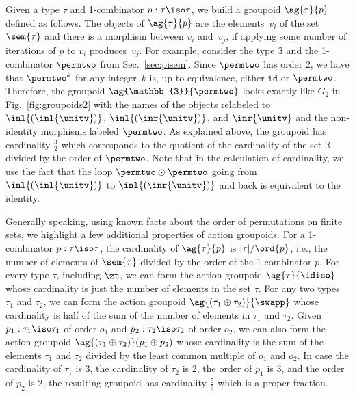 Given a type $\tau$ and 1-combinator $p : \tau \iso \tau$, we build a
groupoid $\ag{\tau}{p}$ defined as follows. The objects of
$\ag{\tau}{p}$ are the elements~$v_i$ of the set $\sem{\tau}$ and there
is a morphism between $v_i$ and~$v_j$, if applying some number of
iterations of $p$ to $v_i$ produces~$v_j$. For example, consider the
type $\mathbb{3}$ and the 1-combinator $\permtwo$ from
Sec.~\ref{sec:pisem}. Since $\permtwo$ has order 2, we have that $\permtwo ^ k$
for any integer~$k$ is, up to equivalence, either $\texttt{id}$ or
$\permtwo$. Therefore, the groupoid $\ag{\mathbb{3}}{\permtwo}$ looks exactly like
$G_2$ in Fig.~\ref{fig:groupoids2} with the names of the objects
relabeled to $\inl{(\inl{\unitv})}$, $\inl{(\inr{\unitv})}$, and
$\inr{\unitv}$ and the non-identity morphisms labeled $\permtwo$. As
explained above, the groupoid has cardinality $\frac{3}{2}$ which
corresponds to the quotient of the cardinality of the set $\mathbb{3}$
divided by the order of $\permtwo$. Note that in the calculation of
cardinality, we use the fact that the loop $\permtwo \odot \permtwo$ going from
$\inl{(\inl{\unitv})}$ to $\inl{(\inr{\unitv})}$ and back is equivalent
to the identity.

Generally speaking, using known facts about the order of permutations
on finite sets, we highlight a few additional properties of action
groupoids. For a 1-combinator $p : \tau \iso \tau$, the cardinality of
$\ag{\tau}{p}$ is $|\tau|/\ord{p}$, i.e., the number of elements of
$\sem{\tau}$ divided by the order of the 1-combinator $p$.  For every
type $\tau$, including $\zt$, we can form the action groupoid
$\ag{\tau}{\idiso}$ whose cardinality is just the number of elements
in the set $\tau$. For any two types $\tau_1$ and $\tau_2$, we can
form the action groupoid $\ag{(\tau_1\oplus\tau_2)}{\swapp}$ whose
cardinality is half of the sum of the number of elements in $\tau_1$
and $\tau_2$. Given $p_1 : \tau_1 \iso \tau_1$ of order $o_1$ and
$p_2 : \tau_2 \iso \tau_2$ of order $o_2$, we can also form the action
groupoid $\ag{(\tau_1\oplus\tau_2)}({p_1\oplus p_2)}$ whose cardinality is
the sum of the elements $\tau_1$ and $\tau_2$ divided by the least
common multiple of $o_1$ and $o_2$. In case the cardinality of
$\tau_1$ is 3, the cardinality of $\tau_2$ is 2, the order of $p_1$ is
3, and the order of $p_2$ is 2, the resulting groupoid has cardinality
$\frac{5}{6}$ which is a proper fraction.


